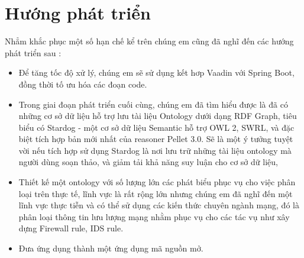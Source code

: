 \section{Hướng phát triển}
Nhẳm khắc phục một số hạn chế kể trên chúng em cũng đã nghĩ đến các hướng phát triển sau :
\begin{itemize}
\item Để tăng tốc độ xử lý, chúng em sẽ sử dụng kết hơp Vaadin với Spring Boot, đồng thời tố ưu hóa các đoạn code.
\item Trong giai đoạn phát triển cuối cùng, chúng em đã tìm hiểu được là đã có những cơ sở dữ liệu hỗ trợ lưu tài liệu Ontology dưới dạng RDF Graph, tiêu biểu có Stardog - một cơ sở dữ liệu Semantic hỗ trợ OWL 2, SWRL, và đặc biệt tích hợp bản mới nhất của reasoner Pellet 3.0. Sẽ là một ý tưởng tuyệt vời nếu tích hợp sử dụng Stardog là nơi lưu trữ những tài liệu ontology mà người dùng soạn thảo, và giảm tải khả năng suy luận cho cơ sở dữ liệu,
\item Thiết kế một ontology với số lượng lớn các phát biểu phục vụ cho việc phân loại trên thực tế, lĩnh vực là rất rộng lớn nhưng chúng em đã nghĩ đến một lĩnh vực thực tiễn và có thể sử dụng các kiến thức chuyên ngành mạng, đó là phân loại thông tin lưu lượng mạng nhằm phục vụ cho các tác vụ như xây dựng Firewall rule, IDS rule.
\item Đưa ứng dụng thành một ứng dụng mã nguồn mở.
\end{itemize}
